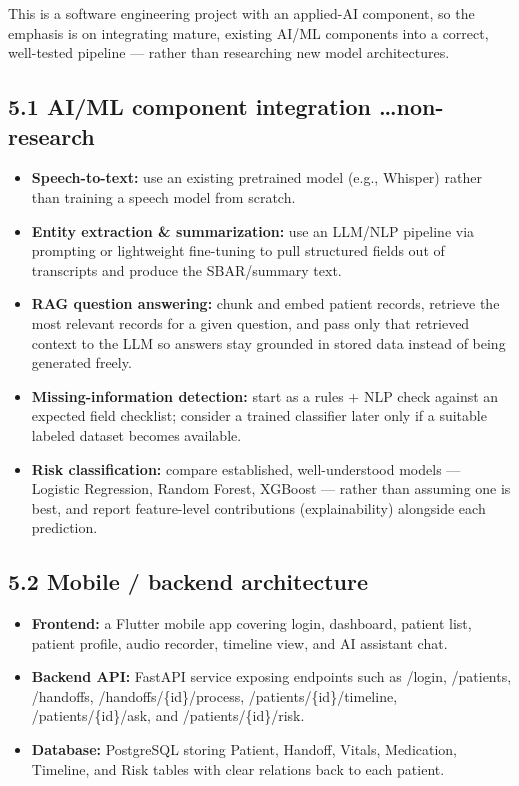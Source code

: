 \documentclass[
]{article}
\begin{document}
This is a software engineering project with an applied-AI component, so
the emphasis is on integrating mature, existing AI/ML components into a
correct, well-tested pipeline --- rather than researching new model
architectures.

\subsection{5.1 AI/ML component integration
\ldots non-research}\label{aiml-component-integration-non-research}

\begin{itemize}
\item
  \textbf{Speech-to-text:} use an existing pretrained model (e.g.,
  Whisper) rather than training a speech model from scratch.
\item
  \textbf{Entity extraction \& summarization:} use an LLM/NLP pipeline
  via prompting or lightweight fine-tuning to pull structured fields out
  of transcripts and produce the SBAR/summary text.
\item
  \textbf{RAG question answering:} chunk and embed patient records,
  retrieve the most relevant records for a given question, and pass only
  that retrieved context to the LLM so answers stay grounded in stored
  data instead of being generated freely.
\item
  \textbf{Missing-information detection:} start as a rules + NLP check
  against an expected field checklist; consider a trained classifier
  later only if a suitable labeled dataset becomes available.
\item
  \textbf{Risk classification:} compare established, well-understood
  models --- Logistic Regression, Random Forest, XGBoost --- rather than
  assuming one is best, and report feature-level contributions
  (explainability) alongside each prediction.
\end{itemize}

\subsection{\texorpdfstring{5.2 Mobile / backend architecture
}{5.2 Mobile / backend architecture }}\label{mobile-backend-architecture}

\begin{itemize}
\item
  \textbf{Frontend:} a Flutter mobile app covering login, dashboard,
  patient list, patient profile, audio recorder, timeline view, and AI
  assistant chat.
\item
  \textbf{Backend API:} FastAPI service exposing endpoints such as
  /login, /patients, /handoffs, /handoffs/\{id\}/process,
  /patients/\{id\}/timeline, /patients/\{id\}/ask, and
  /patients/\{id\}/risk.
\item
  \textbf{Database:} PostgreSQL storing Patient, Handoff, Vitals,
  Medication, Timeline, and Risk tables with clear relations back to
  each patient.
\end{itemize}
\end{document}
